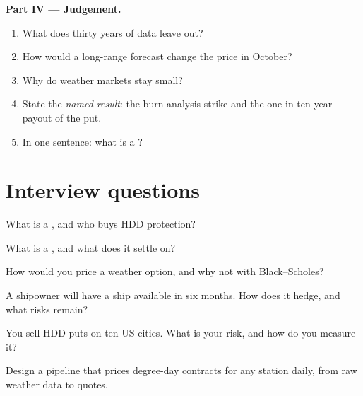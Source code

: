 \begin{problem}
\medskip\noindent\textbf{Part IV --- Judgement.}
\begin{enumerate}[resume]
\item What does thirty years of data leave out?
\item How would a long-range forecast change the price in October?
\item Why do weather markets stay small?
\item State the \emph{named result}: the burn-analysis strike and the one-in-ten-year payout of the put.
\item In one sentence: what is a ?
\end{enumerate}
\end{problem}

\section{Interview questions}

\begin{interviewq}\label{iq:m3:freight-weather-and-other-corners:1}
What is a , and who buys HDD protection?
\end{interviewq}

\begin{interviewq}\label{iq:m3:freight-weather-and-other-corners:2}
What is a , and what does it settle on?
\end{interviewq}

\begin{interviewq}\label{iq:m3:freight-weather-and-other-corners:3}
How would you price a weather option, and why not with Black--Scholes?
\end{interviewq}

\begin{interviewq}\label{iq:m3:freight-weather-and-other-corners:4}
A shipowner will have a ship available in six months. How does it hedge, and what risks remain?
\end{interviewq}

\begin{interviewq}\label{iq:m3:freight-weather-and-other-corners:5}
You sell HDD puts on ten US cities. What is your risk, and how do you measure it?
\end{interviewq}

\begin{interviewq}\label{iq:m3:freight-weather-and-other-corners:6}
Design a pipeline that prices degree-day contracts for any station daily, from raw weather data to quotes.
\end{interviewq}
